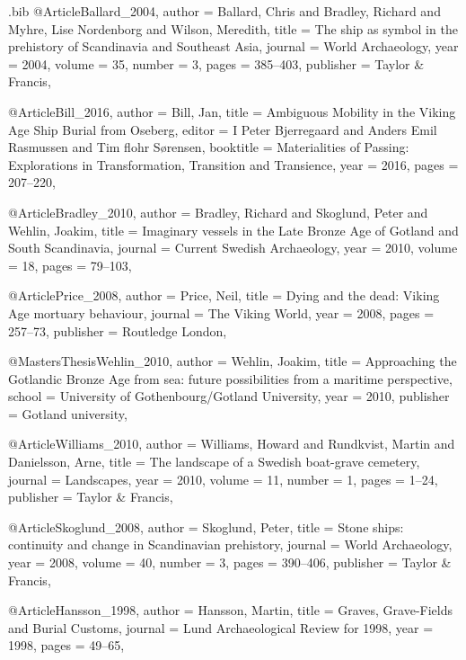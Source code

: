 \begin{filecontents}{\IJSRAidentifier.bib}
@Article{Ballard_2004,
	author    = {Ballard, Chris and Bradley, Richard and Myhre, Lise Nordenborg and Wilson, Meredith},
	title     = {The ship as symbol in the prehistory of Scandinavia and Southeast Asia},
	journal   = {World Archaeology},
	year      = {2004},
	volume    = {35},
	number    = {3},
	pages     = {385--403},
	publisher = {Taylor \& Francis},
}

@Article{Bill_2016,
	author  = {Bill, Jan},
	title   = {Ambiguous Mobility in the Viking Age Ship Burial from Oseberg},
	editor = {I Peter Bjerregaard and Anders Emil Rasmussen and Tim flohr S{\o}rensen},
	booktitle = {Materialities of Passing: Explorations in Transformation, Transition and Transience},
	year    = {2016},
	pages   = {207--220},
}

@Article{Bradley_2010,
	author  = {Bradley, Richard and Skoglund, Peter and Wehlin, Joakim},
	title   = {Imaginary vessels in the Late Bronze Age of Gotland and South Scandinavia},
	journal = {Current Swedish Archaeology},
	year    = {2010},
	volume  = {18},
	pages   = {79--103},
}

@Article{Price_2008,
	author    = {Price, Neil},
	title     = {Dying and the dead: Viking Age mortuary behaviour},
	journal   = {The Viking World},
	year      = {2008},
	pages     = {257--73},
	publisher = {Routledge London},
}

@MastersThesis{Wehlin_2010,
	author    = {Wehlin, Joakim},
	title     = {Approaching the Gotlandic Bronze Age from sea: future possibilities from a maritime perspective},
	school    = {University of Gothenbourg/Gotland University},
	year      = {2010},
	publisher = {Gotland university},
}

@Article{Williams_2010,
	author    = {Williams, Howard and Rundkvist, Martin and Danielsson, Arne},
	title     = {The landscape of a Swedish boat-grave cemetery},
	journal   = {Landscapes},
	year      = {2010},
	volume    = {11},
	number    = {1},
	pages     = {1--24},
	publisher = {Taylor \& Francis},
}

@Article{Skoglund_2008,
	author    = {Skoglund, Peter},
	title     = {Stone ships: continuity and change in Scandinavian prehistory},
	journal   = {World Archaeology},
	year      = {2008},
	volume    = {40},
	number    = {3},
	pages     = {390--406},
	publisher = {Taylor \& Francis},
}

@Article{Hansson_1998,
	author  = {Hansson, Martin},
	title   = {Graves, Grave-Fields and Burial Customs},
	journal = {Lund Archaeological Review for 1998},
	year    = {1998},
	pages   = {49--65},
}


\end{filecontents}
